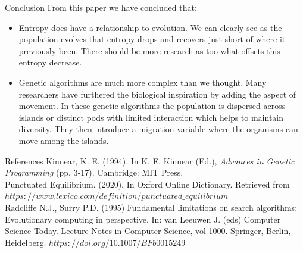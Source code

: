 \documentclass[10pt,aspectratio=169]{beamer}
\begin{document}
\begin{frame}{Conclusion}
	From this paper we have concluded that:
	\begin{itemize}
		\item Entropy does have a relationship to
                  evolution. We can clearly see as the population
                  evolves that entropy drops and recovers just short
                  of where it previously been. There should be more
                  research as too what offsets this entropy decrease.
		
		\item Genetic algorithms are much more complex than we
                  thought. Many researchers have furthered the
                  biological inspiration by adding the aspect of
                  movement. In these genetic algorithms the population
                  is dispersed across islands or distinct pods with
                  limited interaction which helps to maintain
                  diversity. They then introduce a migration variable
                  where the organisms can move among the islands.
		
	\end{itemize}

\end{frame}

\begin{frame}{References}
	Kinnear, K. E. (1994). In K. E. Kinnear (Ed.), \emph{Advances in
	Genetic Programming} (pp. 3-17). Cambridge: MIT Press.\\
	\medskip
	Punctuated Equilibrium. (2020). In Oxford Online Dictionary. Retrieved
	from $https://www.lexico.com/definition/punctuated\_equilibrium$\\
	\medskip
	Radcliffe N.J., Surry P.D. (1995) Fundamental limitations on search
	algorithms: Evolutionary computing in perspective.  In: van Leeuwen
	J. (eds) Computer Science Today. Lecture Notes in Computer Science,
	vol 1000. Springer, Berlin, Heidelberg.
	$https://doi.org/10.1007/BFb0015249$\\
	
\end{frame}








\end{document}
